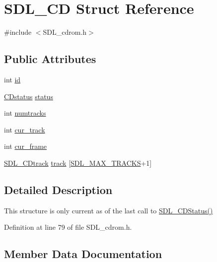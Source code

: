 \hypertarget{struct_s_d_l___c_d}{}\section{S\+D\+L\+\_\+\+C\+D Struct Reference}
\label{struct_s_d_l___c_d}


{\ttfamily \#include $<$S\+D\+L\+\_\+cdrom.\+h$>$}

\subsection*{Public Attributes}
\begin{DoxyCompactItemize}
\item 
int \hyperlink{struct_s_d_l___c_d_ab48f9cbecf78bc689649d877eceba103}{id}
\item 
\hyperlink{_s_d_l__cdrom_8h_ae689551deb9bd434bce7e4c39e45e15d}{C\+Dstatus} \hyperlink{struct_s_d_l___c_d_afaab8559e9b75bbf501b31b5f5f01a9b}{status}
\end{DoxyCompactItemize}
{\bf }\par
\begin{DoxyCompactItemize}
\item 
int \hyperlink{struct_s_d_l___c_d_ade87d0c7e217291fb1f1a53d03e1bfdf}{numtracks}
\item 
int \hyperlink{struct_s_d_l___c_d_afe5a3ca65be47b34c72ac21ce28de31e}{cur\+\_\+track}
\item 
int \hyperlink{struct_s_d_l___c_d_a42123aeca413aa581c1403843d1a5809}{cur\+\_\+frame}
\item 
\hyperlink{struct_s_d_l___c_dtrack}{S\+D\+L\+\_\+\+C\+Dtrack} \hyperlink{struct_s_d_l___c_d_ad9dd6d42b8c1677e83926aa9e9031ecc}{track} \mbox{[}\hyperlink{_s_d_l__cdrom_8h_a39eb10e45614b6b607fe7649c9dd75da}{S\+D\+L\+\_\+\+M\+A\+X\+\_\+\+T\+R\+A\+C\+K\+S}+1\mbox{]}
\end{DoxyCompactItemize}



\subsection{Detailed Description}
This structure is only current as of the last call to \hyperlink{_s_d_l__cdrom_8h_a696066cb9444206195dfad7f77f2b38c}{S\+D\+L\+\_\+\+C\+D\+Status()} 

Definition at line 79 of file S\+D\+L\+\_\+cdrom.\+h.



\subsection{Member Data Documentation}
\hypertarget{struct_s_d_l___c_d_a42123aeca413aa581c1403843d1a5809}{}
